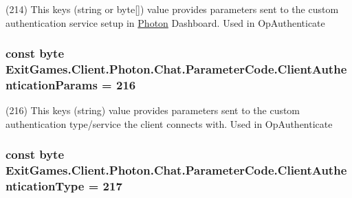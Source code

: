 (214) This key\textquotesingle{}s (string or byte\mbox{[}\mbox{]}) value provides parameters sent to the custom authentication service setup in \hyperlink{namespace_exit_games_1_1_client_1_1_photon}{Photon} Dashboard. Used in Op\+Authenticate

\subsubsection[{\texorpdfstring{Client\+Authentication\+Params}{ClientAuthenticationParams}}]{\setlength{\rightskip}{0pt plus 5cm}const byte Exit\+Games.\+Client.\+Photon.\+Chat.\+Parameter\+Code.\+Client\+Authentication\+Params = 216}\hypertarget{class_exit_games_1_1_client_1_1_photon_1_1_chat_1_1_parameter_code_a70f578a01789db64e2aefa055fba1732}{}\label{class_exit_games_1_1_client_1_1_photon_1_1_chat_1_1_parameter_code_a70f578a01789db64e2aefa055fba1732}


(216) This key\textquotesingle{}s (string) value provides parameters sent to the custom authentication type/service the client connects with. Used in Op\+Authenticate

\subsubsection[{\texorpdfstring{Client\+Authentication\+Type}{ClientAuthenticationType}}]{\setlength{\rightskip}{0pt plus 5cm}const byte Exit\+Games.\+Client.\+Photon.\+Chat.\+Parameter\+Code.\+Client\+Authentication\+Type = 217}\hypertarget{class_exit_games_1_1_client_1_1_photon_1_1_chat_1_1_parameter_code_a244b3fc5ac2e8b3a97428b6534ca9da6}{}\label{class_exit_games_1_1_client_1_1_photon_1_1_chat_1_1_parameter_code_a244b3fc5ac2e8b3a97428b6534ca9da6}


